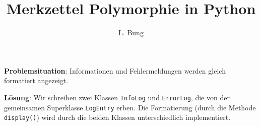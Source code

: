 \documentclass[11pt, a4paper, oneside]{article}
\begin{document}
	\author{L. Bung}
	\title{Merkzettel\hspace{10cm} Polymorphie in Python}
	\subject{SAE}
	\maketitle
	
	\textbf{Problemsituation}: Informationen und Fehlermeldungen werden gleich formatiert angezeigt.
	
	
	
	\textbf{Lösung}: Wir schreiben zwei Klassen \texttt{InfoLog} und \texttt{ErrorLog}, die von der gemeinsamen Superklasse \texttt{LogEntry} erben.
	Die Formatierung (durch die Methode \texttt{display()}) wird durch die beiden Klassen unterschiedlich implementiert.
	
	
	
	
\end{document}
